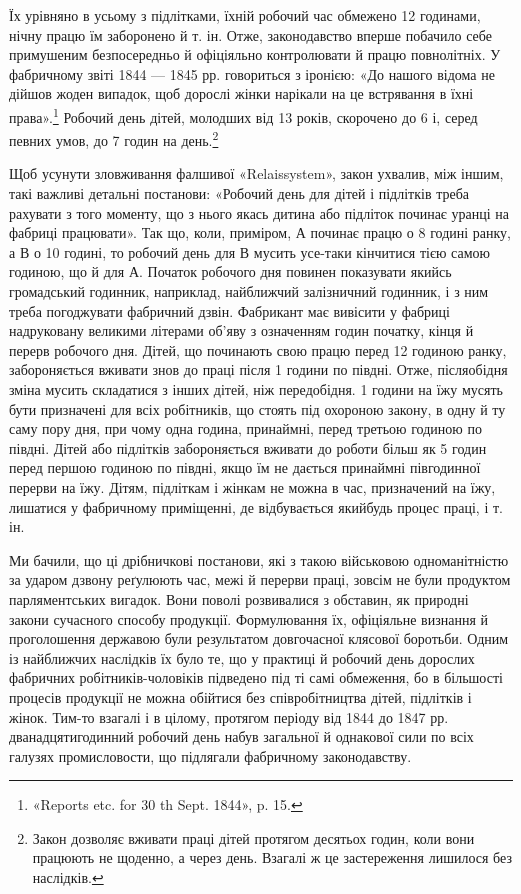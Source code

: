 Їх урівняно в усьому з підлітками, їхній робочий час обмежено
12 годинами, нічну працю їм заборонено й т. ін. Отже, законодавство
вперше побачило себе примушеним безпосередньо й офіціяльно
контролювати й працю повнолітніх. У фабричному звіті 1844 —
1845 рр. говориться з іронією: «До нашого відома не дійшов
жоден випадок, щоб дорослі жінки нарікали на це встрявання
в їхні права».\footnote{
«Reports etc. for 30 th Sept. 1844», p. 15.
} Робочий день дітей, молодших від 13 років,
скорочено до 6 і, серед певних умов, до 7 годин на день.\footnote{
Закон дозволяє вживати праці дітей протягом десятьох годин,
коли вони працюють не щоденно, а через день. Взагалі ж це застереження
лишилося без наслідків.
}

Щоб усунути зловживання фалшивої «Relaissystem», закон
ухвалив, між іншим, такі важливі детальні постанови: «Робочий
день для дітей і підлітків треба рахувати з того моменту, що з
нього якась дитина або підліток починає уранці на фабриці
працювати». Так що, коли, приміром, А починає працю о 8 годині
ранку, а В о 10 годині, то робочий день для В мусить усе-таки кінчитися тією самою годиною, що й для
А. Початок робочого
дня повинен показувати якийсь громадський годинник, наприклад,
найближчий залізничний годинник, і з ним треба погоджувати
фабричний дзвін. Фабрикант має вивісити у фабриці надруковану
великими літерами об’яву з означенням годин початку,
кінця й перерв робочого дня. Дітей, що починають свою працю
перед 12 годиною ранку, забороняється вживати знов до праці
після 1 години по півдні. Отже, післяобідня зміна мусить складатися
з інших дітей, ніж передобідня. 1 години на їжу мусять
бути призначені для всіх робітників, що стоять під охороною закону,
в одну й ту саму пору дня, при чому одна година, принаймні,
перед третьою годиною по півдні. Дітей або підлітків забороняється
вживати до роботи більш як 5 годин перед першою годиною
по півдні, якщо їм не дається принаймні півгодинної перерви на
їжу. Дітям, підліткам і жінкам не можна в час, призначений на
їжу, лишатися у фабричному приміщенні, де відбувається якийбудь
процес праці, і т. ін.

Ми бачили, що ці дрібничкові постанови, які з такою військовою
одноманітністю за ударом дзвону реґулюють час, межі й
перерви праці, зовсім не були продуктом парляментських вигадок.
Вони поволі розвивалися з обставин, як природні закони
сучасного способу продукції. Формулювання їх, офіціяльне
визнання й проголошення державою були результатом довгочасної
клясової боротьби. Одним із найближчих наслідків їх
було те, що у практиці й робочий день дорослих фабричних робітників-чоловіків
підведено під ті самі обмеження, бо в більшості
процесів продукції не можна обійтися без співробітництва дітей,
підлітків і жінок. Тим-то взагалі і в цілому, протягом періоду
від 1844 до 1847 рр. дванадцятигодинний робочий день набув загальної
й однакової сили по всіх галузях промисловости, що
підлягали фабричному законодавству.